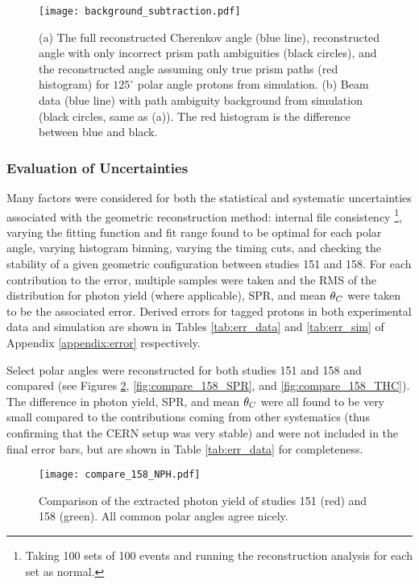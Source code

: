 \begin{figure}[!htb]
	\centering
	\texttt{[image: background\_subtraction.pdf]}
	\caption{(a) The full reconstructed Cherenkov angle (blue line), reconstructed angle with only incorrect prism path ambiguities (black circles), and the reconstructed angle assuming only true prism paths (red histogram) for $125^\circ$ polar angle protons from simulation. (b) Beam data (blue line) with path ambiguity background from simulation (black circles, same as (a)). The red histogram is the difference between blue and black.}
	\label{fig:background_sub}
\end{figure}

\subsubsection{Evaluation of Uncertainties}
Many factors were considered for both the statistical and systematic uncertainties associated with the geometric reconstruction method: internal file consistency \footnote{Taking 100 sets of 100 events and running the reconstruction analysis for each set as normal.}, varying the fitting function and fit range found to be optimal for each polar angle, varying histogram binning, varying the timing cuts, and checking the stability of a given geometric configuration between studies 151 and 158. For each contribution to the error, multiple samples were taken and the RMS of the distribution for photon yield (where applicable), SPR, and mean $\theta_{C}$ were taken to be the associated error. Derived errors for tagged protons in both experimental data and simulation are shown in Tables \ref{tab:err_data} and \ref{tab:err_sim} of Appendix \ref{appendix:error} respectively.

Select polar angles were reconstructed for both studies 151 and 158 and compared (see Figures \ref{fig:compare_158_NPH}, \ref{fig:compare_158_SPR}, and \ref{fig:compare_158_THC}). The difference in photon yield, SPR, and mean $\theta_{C}$ were all found to be very small compared to the contributions coming from other systematics (thus confirming that the CERN setup was very stable) and were not included in the final error bars, but are shown in Table \ref{tab:err_data} for completeness.

\begin{figure}[!htb]
	\centering
	\texttt{[image: compare\_158\_NPH.pdf]}
	\caption{Comparison of the extracted photon yield of studies 151 (red) and 158 (green). All common polar angles agree nicely.}
	\label{fig:compare_158_NPH}
\end{figure}


